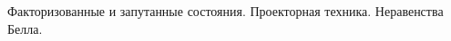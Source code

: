 \documentclass[__main__.tex]{subfiles}
\begin{document}
Факторизованные и запутанные состояния. Проекторная техника. Неравенства Белла.\\ 

\end{document}
